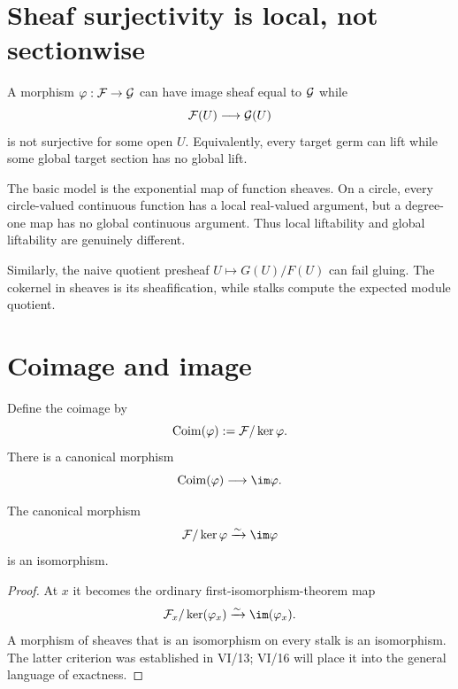 

\section{Sheaf surjectivity is local, not sectionwise}

A morphism $\varphi:\mathcal F\to\mathcal G$ can have image sheaf equal to $\mathcal G$ while
\[
\mathcal F(U)\longrightarrow\mathcal G(U)
\]
is not surjective for some open $U$.  Equivalently, every target germ can lift while some
global target section has no global lift.

The basic model is the exponential map of function sheaves.  On a circle, every circle-valued
continuous function has a local real-valued argument, but a degree-one map has no global
continuous argument.  Thus local liftability and global liftability are genuinely different.



\begin{example}\label{ex:vi15-expand-03}
Similarly, the naive quotient presheaf $U\mapsto G(U)/F(U)$ can fail gluing.  The cokernel in sheaves is its sheafification, while stalks compute the expected module quotient.
\end{example}
\section{Coimage and image}

Define the coimage by
\[
\operatorname{Coim}(\varphi):=\mathcal F/\ker\varphi.
\]
There is a canonical morphism
\[
\Coim(\varphi)\longrightarrow\im\varphi.
\]

\begin{theorem}
The canonical morphism
\[
\F/\ker\varphi\xrightarrow{\sim}\im\varphi
\]
is an isomorphism.
\end{theorem}
\begin{proof}
At $x$ it becomes the ordinary first-isomorphism-theorem map
\[
\F_x/\ker(\varphi_x)\xrightarrow{\sim}\im(\varphi_x).
\]
A morphism of sheaves that is an isomorphism on every stalk is an isomorphism.  The latter
criterion was established in VI/13; VI/16 will place it into the general language of exactness.
\end{proof}

